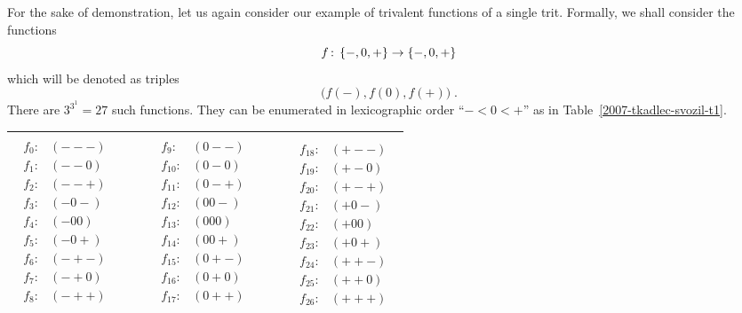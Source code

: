 \documentclass[fleqn,twoside]{article}
\begin{document}
For the sake of demonstration, let us again consider our example of trivalent functions of a single trit.
Formally, we shall consider the functions $$f \,{:}\linebreak[0]\,\;
\{-,0,+\} \to \{-,0,+\}$$ which will be denoted as triples
$$\bigl( f(-), f(0), f(+) \bigr)\; .$$
There are $3^{3^1} = 27$ such functions.
They can be enumerated in lexicographic order ``$-<0<+$'' as in Table~\ref{2007-tkadlec-svozil-t1}.
\begin{table*}
\caption{Enumeration of all trivalent functions of a single trit  in lexicographic order ``$-<0<+$.''}
\label{2007-tkadlec-svozil-t1}
\renewcommand{\tabcolsep}{2pc} %
\renewcommand{\arraystretch}{1.2} %
\begin{tabular}{c}
\hline
$
\begin{array}{lllll}
\begin{array}{ll}
f_{0}: & (---)\\  f_{1}: & (--0)\\  f_{2}: & (--+)\\ f_{3}: & (-0-)\\  f_{4}: & (-00)\\  f_{5}: & (-0+)\\  f_{6}: & (-+-)\\  f_{7}: & (-+0)\\  f_{8}: & (-++)\\
\end{array}
&   \qquad  &
\begin{array}{ll}
f_{9}: & (0--)\\  f_{10}: & (0-0)\\  f_{11}: & (0-+)\\ f_{12}: & (00-)\\  f_{13}: & (000)\\  f_{14}: & (00+)\\ f_{15}: & (0+-)\\  f_{16}: & (0+0)\\  f_{17}: & (0++)\\
\end{array}
&   \qquad &
\begin{array}{ll}
f_{18}: & (+--)\\  f_{19}: & (+-0)\\  f_{20}: & (+-+)\\ f_{21}: & (+0-)\\  f_{22}: & (+00)\\  f_{23}: & (+0+)\\ f_{24}: & (++-)\\  f_{25}: & (++0)\\  f_{26}: & (+++)
\end{array}
\end{array}
$   \\
\hline
\end{tabular}
\end{table*}
\end{document}
